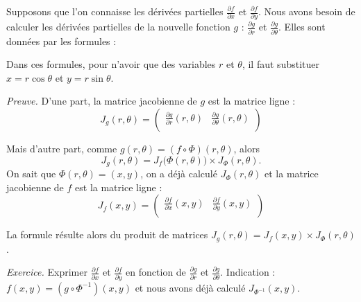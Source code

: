 \documentclass[11pt, class=report,crop=false]{standalone}
\begin{document}
Supposons que l'on connaisse les dérivées partielles 
$\frac{\partial f}{\partial x}$ et $\frac{\partial f}{\partial y}$.
Nous avons besoin de calculer les dérivées partielles de la nouvelle fonction $g$ : 
$\frac{\partial g}{\partial r}$ et $\frac{\partial g}{\partial \theta}$.
Elles sont données par les formules :

Dans ces formules, pour n'avoir que des variables $r$ et $\theta$, il faut substituer $x = r\cos\theta$ et $y=r\sin\theta$.

\bigskip

\emph{Preuve.}
D'une part, la matrice jacobienne de $g$ est la matrice ligne :
$$J_g(r,\theta) = 
\begin{pmatrix}
\frac{\partial g}{\partial r}(r,\theta) &
\frac{\partial g}{\partial \theta}(r,\theta) \\
\end{pmatrix}$$

Mais d'autre part, comme $g(r,\theta)= (f \circ \Phi) (r,\theta)$, alors
$$ J_g(r,\theta) = J_f\big( \Phi(r,\theta) \big) \times J_\Phi(r,\theta) .$$
On sait que $\Phi(r,\theta) = (x,y)$, on a déjà calculé $J_\Phi(r,\theta)$ et la matrice jacobienne de $f$ est la matrice ligne :
$$
J_f(x,y) = 
\begin{pmatrix}
\frac{\partial f}{\partial x}(x,y) &
\frac{\partial f}{\partial y}(x,y) \\
\end{pmatrix}
$$

La formule résulte alors du produit de matrices 
$J_g(r,\theta) = J_f(x,y) \times J_\Phi(r,\theta)$.

\bigskip

\emph{Exercice.}
Exprimer $\frac{\partial f}{\partial x}$ et $\frac{\partial f}{\partial y}$ en fonction de $\frac{\partial g}{\partial r}$ et $\frac{\partial g}{\partial \theta}$. 
Indication : $f(x,y) = (g \circ \Phi^{-1}) (x,y)$ et nous avons déjà calculé $J_{\Phi^{-1}}(x,y)$.


\bigskip
\end{document}

